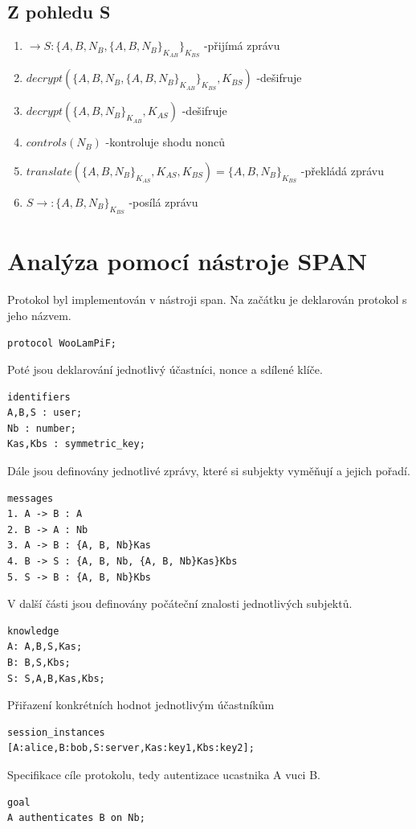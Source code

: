 \documentclass[11pt,a4paper]{article}
\begin{document}
\subsection{Z pohledu S}
\begin{enumerate}
\item $\rightarrow S\colon \{A, B, N_B, \{A, B, N_B\}_{K_{AB}}\}_{K_{BS}}$ -přijímá zprávu
\item $decrypt(\{A, B, N_B, \{A, B, N_B\}_{K_{AB}}\}_{K_{BS}},K_{BS})$ -dešifruje
\item $decrypt(\{A, B, N_B\}_{K_{AB}},K_{AS})$ -dešifruje
\item $controls(N_B)$ -kontroluje shodu nonců
\item $translate(\{A, B, N_B\}_{K_{AS}}, K_{AS}, K_{BS})=\{A, B, N_B\}_{K_{BS}}$ -překládá zprávu
\item $S \rightarrow\colon \{A, B, N_B\}_{K_{BS}}$ -posílá zprávu
\end{enumerate}

\section{Analýza pomocí nástroje SPAN}
Protokol byl implementován v nástroji span. Na začátku
je deklarován protokol s jeho názvem.

\lstset{numbers=left, stepnumber=1, numberstyle=\tiny,
        tabsize=1, xleftmargin=0.6cm, basicstyle=\ttfamily,
        morecomment=[l]\#}

\begin{lstlisting}[name=WooLamPiF]
protocol WooLamPiF;
\end{lstlisting}
Poté jsou deklarování jednotlivý účastníci, nonce a sdílené klíče.
\begin{lstlisting}[name=WooLamPiF]
identifiers
A,B,S : user;
Nb : number;
Kas,Kbs : symmetric_key;
\end{lstlisting}
Dále jsou definovány jednotlivé zprávy, které si subjekty vyměňují a jejich pořadí.
\begin{lstlisting}[name=WooLamPiF]
messages
1. A -> B : A
2. B -> A : Nb
3. A -> B : {A, B, Nb}Kas
4. B -> S : {A, B, Nb, {A, B, Nb}Kas}Kbs
5. S -> B : {A, B, Nb}Kbs
\end{lstlisting}
V další části jsou definovány počáteční znalosti jednotlivých subjektů.
\begin{lstlisting}[name=WooLamPiF]
knowledge
A: A,B,S,Kas;
B: B,S,Kbs;
S: S,A,B,Kas,Kbs;
\end{lstlisting}
Přiřazení konkrétních hodnot jednotlivým účastníkům
\begin{lstlisting}[name=WooLamPiF]
session_instances
[A:alice,B:bob,S:server,Kas:key1,Kbs:key2];
\end{lstlisting}
Specifikace cíle protokolu, tedy autentizace ucastnika A vuci B.
\begin{lstlisting}[name=WooLamPiF]
goal
A authenticates B on Nb;
\end{lstlisting}
\end{document}
